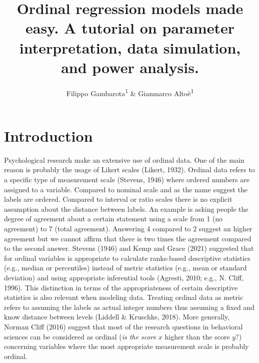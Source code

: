 \documentclass[
  man,floatsintext]{apa6}
\title{Ordinal regression models made easy. A tutorial on parameter interpretation, data simulation, and power analysis.}
\author{Filippo Gambarota\textsuperscript{1} \& Gianmarco Altoè\textsuperscript{1}}
\date{}
\affiliation{\vspace{0.5cm}\textsuperscript{1} Department of Developmental Psychology and Socialization, University of Padova, Italy}
\begin{document}
\maketitle

\scriptsize

\normalsize

\section{Introduction}\label{introduction}

Psychological research make an extensive use of ordinal data. One of the main reason is probably the usage of Likert scales (Likert, 1932). Ordinal data refers to a specific type of measurement scale (Stevens, 1946) where ordered numbers are assigned to a variable. Compared to nominal scale and as the name suggest the labels are ordered. Compared to interval or ratio scales there is no explicit assumption about the distance between labels. An example is asking people the degree of agreement about a certain statement using a scale from 1 (no agreement) to 7 (total agreement). Answering 4 compared to 2 suggest an higher agreement but we cannot affirm that there is two times the agreement compared to the second answer. Stevens (1946) and Kemp and Grace (2021) suggested that for ordinal variables is appropriate to calculate ranks-based descriptive statistics (e.g., median or percentiles) instead of metric statistics (e.g., mean or standard deviation) and using appropriate inferential tools (Agresti, 2010; e.g., N. Cliff, 1996). This distinction in terms of the appropriateness of certain descriptive statistics is also relevant when modeling data. Treating ordinal data as metric refers to assuming the labels as actual integer numbers thus assuming a fixed and know distance between levels (Liddell \& Kruschke, 2018). More generally, Norman Cliff (2016) suggest that most of the research questions in behavioral sciences can be considered as ordinal (\emph{is the score} \(x\) higher than the score \(y\)?) concerning variables where the most appropriate measurement scale is probably ordinal.
\end{document}
